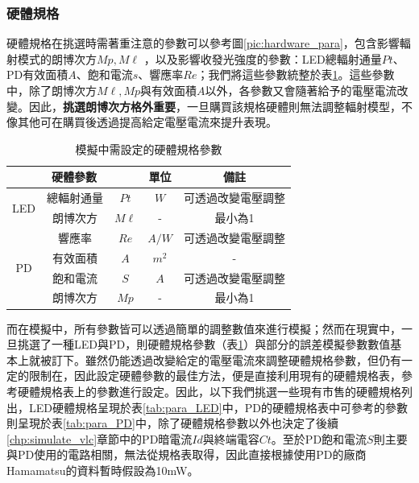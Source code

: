 \subsubsection{硬體規格}

硬體規格在挑選時需著重注意的參數可以參考圖\ref{pic:hardware_para}，包含影響輻射模式的朗博次方$Mp,M\ell$
，以及影響收發光強度的參數：LED總輻射通量$Pt$、PD有效面積$A$、飽和電流$s$、響應率$Re$；我們將這些參數統整於表\ref{tab:para_hardware}。這些參數中，除了朗博次方$M\ell,Mp$與有效面積$A$以外，各參數又會隨著給予的電壓電流改變。因此，\textbf{挑選朗博次方格外重要}，一旦購買該規格硬體則無法調整輻射模型，不像其他可在購買後透過提高給定電壓電流來提升表現。

\begin{table}[htpb]
\renewcommand{\arraystretch}{1.3}
\setlength{\arrayrulewidth}{0.15mm}
\setlength{\doublerulesep}{0.12mm}
\caption{模擬中需設定的硬體規格參數}
\label{tab:para_hardware}
\centering
\begin{tabular}{|c|cc|c|c|}
\hline
\multicolumn{3}{|c|}{\textbf{硬體參數}}  &\textbf{單位}  &  \textbf{備註}   \\
\hline
\multirow{2}{*}{LED} 
& 總輻射通量 &$Pt$ & $W$ & 可透過改變電壓調整 \\
 & 朗博次方& $M\ell$& -  & 最小為1 \\\hline
\multirow{4}{*}{PD} 
& 響應率 &$Re$ & $A/W$ & 可透過改變電壓調整 \\
& 有效面積& $A$& $m^2$ & - \\
& 飽和電流& $S$& $A$ & 可透過改變電壓調整 \\
& 朗博次方& $Mp$& -  & 最小為1 \\\hline
\end{tabular}
\end{table}

而在模擬中，所有參數皆可以透過簡單的調整數值來進行模擬；然而在現實中，一旦挑選了一種LED與PD，則硬體規格參數（表\ref{tab:para_hardware}）與部分的誤差模擬參數數值基本上就被訂下。雖然仍能透過改變給定的電壓電流來調整硬體規格參數，但仍有一定的限制在，因此設定硬體參數的最佳方法，便是直接利用現有的硬體規格表，參考硬體規格表上的參數進行設定。因此，以下我們挑選一些現有市售的硬體規格列出，LED硬體規格呈現於表\ref{tab:para_LED}中，PD的硬體規格表中可參考的參數則呈現於表\ref{tab:para_PD}中，除了硬體規格參數以外也決定了後續\ref{chp:simulate_vlc}章節中的PD暗電流$Id$與終端電容$Ct$。至於PD飽和電流$S$則主要與PD使用的電路相關\cite{hamamatsu}，無法從規格表取得，因此直接根據使用PD的廠商Hamamatsu的資料暫時假設為10mW\cite{hamamatsu}。

